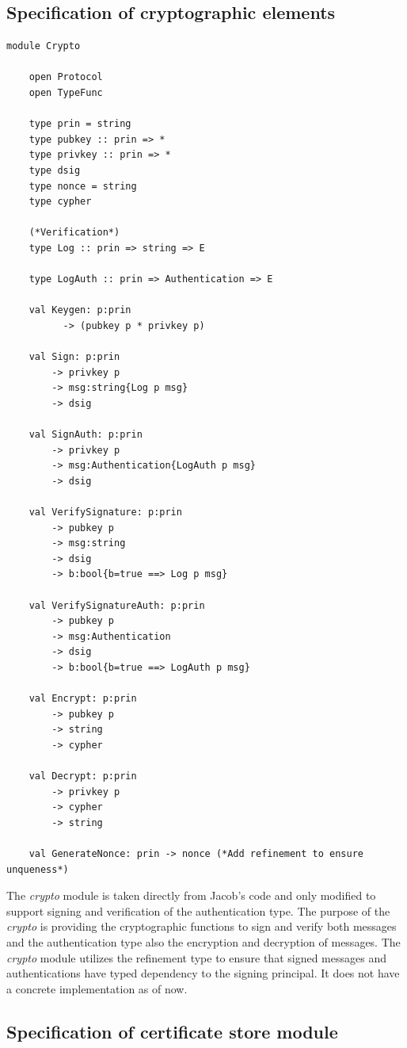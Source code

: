 \documentclass[twosided]{report}
\begin{document}
\subsection{Specification of cryptographic elements}

\begin{lstlisting}[style=fstar, caption={Specification of cryptographic elements}]
	module Crypto
	
	open Protocol
	open TypeFunc

	type prin = string
	type pubkey :: prin => *
	type privkey :: prin => *
	type dsig
	type nonce = string
	type cypher

	(*Verification*)
	type Log :: prin => string => E

	type LogAuth :: prin => Authentication => E

	val Keygen: p:prin
		  -> (pubkey p * privkey p)

	val Sign: p:prin
		-> privkey p
		-> msg:string{Log p msg}
		-> dsig

	val SignAuth: p:prin
		-> privkey p
		-> msg:Authentication{LogAuth p msg}
		-> dsig

	val VerifySignature: p:prin
		-> pubkey p 
		-> msg:string
		-> dsig
		-> b:bool{b=true ==> Log p msg}

	val VerifySignatureAuth: p:prin
		-> pubkey p 
		-> msg:Authentication
		-> dsig
		-> b:bool{b=true ==> LogAuth p msg}

	val Encrypt: p:prin
		-> pubkey p
		-> string
		-> cypher

	val Decrypt: p:prin
		-> privkey p
		-> cypher
		-> string

	val GenerateNonce: prin -> nonce (*Add refinement to ensure unqueness*)
\end{lstlisting}

The \emph{crypto} module is taken directly from Jacob's code and only modified to support signing and verification of the authentication type. The purpose of the \emph{crypto} is providing the cryptographic functions to sign and verify both messages and the authentication type also the encryption and decryption of messages. The \emph{crypto} module utilizes the refinement type to ensure that signed messages and authentications have typed dependency to the signing principal. It does not have a concrete implementation as of now.
\subsection{Specification of certificate store module}
\end{document}

